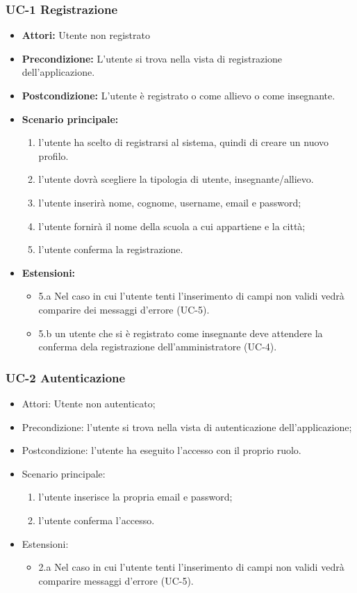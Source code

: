 \subsubsection{UC-1 Registrazione}
\begin{itemize}
		\item \textbf{Attori: }Utente non registrato
		\item \textbf{Precondizione: }L'utente si trova nella vista di registrazione dell'applicazione.
		\item \textbf{Postcondizione: }L'utente è registrato o come allievo o come insegnante.
		\item \textbf{Scenario principale: }
		\begin{enumerate}
		\item l'utente ha scelto di registrarsi al sistema, quindi di creare un nuovo profilo. 
		\item l'utente dovrà scegliere la tipologia di utente, insegnante/allievo. 
		\item l'utente inserirà nome, cognome, username, email e password;
		\item l'utente fornirà il nome della scuola a cui appartiene e la città; 
		\item l'utente conferma la registrazione.
		\end{enumerate}
		\item \textbf{Estensioni: }
		\begin{itemize}
			\item 5.a Nel caso in cui l'utente tenti l'inserimento di campi non validi vedrà comparire dei messaggi d'errore (UC-5).
			\item 5.b un utente che si è registrato come insegnante deve attendere la conferma dela registrazione dell'amministratore (UC-4).
		\end{itemize}
	\end{itemize}
\subsubsection{UC-2 Autenticazione}
		\begin{itemize}
			\item Attori: Utente non autenticato;
			\item Precondizione: l'utente si trova nella vista di autenticazione dell'applicazione;
			\item Postcondizione: l'utente ha eseguito l'accesso con il proprio ruolo.
			\item Scenario principale:
				\begin{enumerate}
					\item l'utente inserisce la propria email e password;
					\item l'utente conferma l'accesso.
				\end{enumerate}
				\item Estensioni:
				\begin{itemize}
					\item 2.a Nel caso in cui l'utente tenti l'inserimento di campi non validi vedrà comparire messaggi d'errore (UC-5).
				\end{itemize}
		\end{itemize}
		
